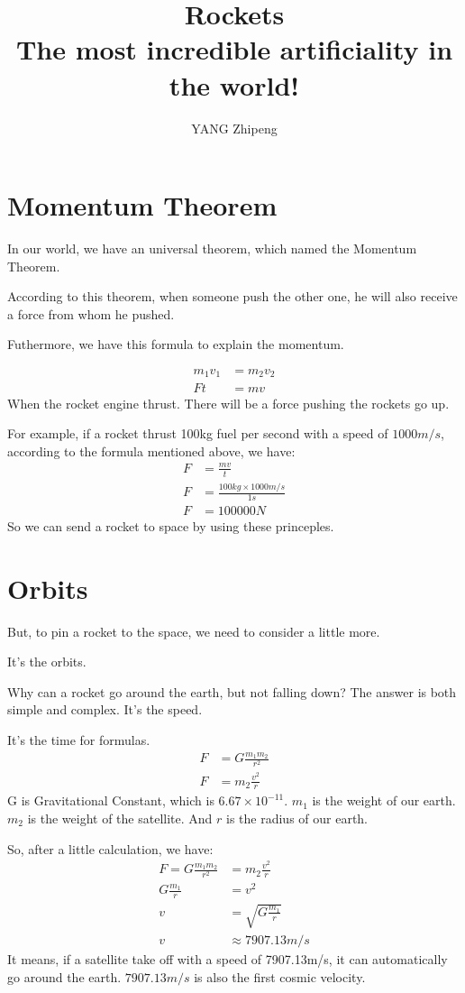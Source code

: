 \documentclass[UTF8,12pt]{ctexart}
\title{\textbf{Rockets}\\\small{The most incredible artificiality in the world!}}
\author{YANG Zhipeng}
\date{}
\begin{document}
\maketitle
\pagestyle{fancy}
\section{Momentum Theorem}
In our world, we have an universal theorem, which named the Momentum Theorem.

According to this theorem, when someone push the other one, he will also receive a force from whom he pushed.

Futhermore, we have this formula to explain the momentum.

\begin{align}
m_{1}v_{1}&=m_{2}v_{2}\\
Ft&=mv
\end{align}
When the rocket engine thrust. There will be a force pushing the rockets go up.

For example, if a rocket thrust 100kg fuel per second with a speed of $1000m/s$, according to the formula mentioned above, we have:
\begin{align}
F&=\frac{mv}{t}\\
F&=\frac{100kg\times1000m/s}{1s}\\
F&=100000N
\end{align}
So we can send a rocket to space by using these princeples.
\section{Orbits}
But, to pin a rocket to the space, we need to consider a little more.

It's the orbits.

Why can a rocket go around the earth, but not falling down? The answer is both simple and complex. It's the speed.

It's the time for formulas.
\begin{align}
F&=G\frac{m_{1}m_{2}}{r^{2}}\\
F&=m_{2}\frac{v^{2}}{r}
\end{align}
G is Gravitational Constant, which is $6.67\times10^{-11}$. $m_{1}$ is the weight of our earth. $m_{2}$ is the weight of the satellite. And $r$ is the radius of our earth.

So, after a little calculation, we have:
\begin{align}
F=G\frac{m_{1}m_{2}}{r^{2}}&=m_{2}\frac{v^{2}}{r}\\
G\frac{m_{1}}{r}&=v^{2}\\
v&=\sqrt{G\frac{m_{1}}{r}}\\
v&\approx7907.13m/s
\end{align}
It means, if a satellite take off with a speed of 7907.13m/s, it can automatically go around the earth. $7907.13m/s$ is also the first cosmic velocity.
\end{document}
